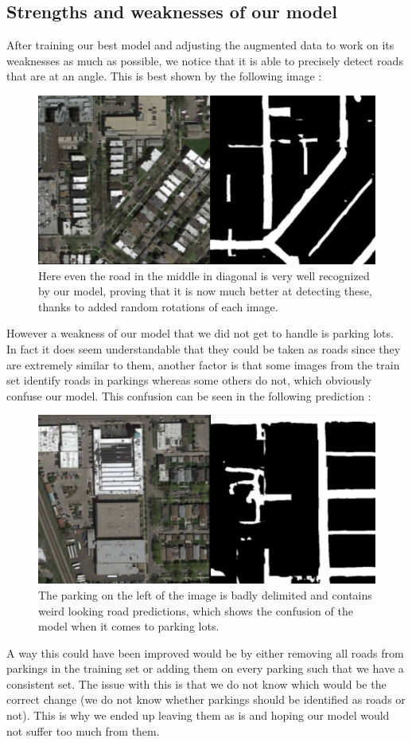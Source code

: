 \documentclass[10pt,conference,compsocconf]{IEEEtran}
\begin{document}
\subsection{Strengths and weaknesses of our model}
After training our best model and adjusting the augmented data to work on its weaknesses as much as possible, we notice that it is able to precisely detect roads that are at an angle. This is best shown by the following image :
\begin{figure}[H]
    \centering
    \includegraphics[scale = 0.3]{report_images/diagonal.jpg} %
    \caption{Here even the road in the middle in diagonal is very well recognized by our model, proving that it is now much better at detecting these, thanks to added random rotations of each image.}
\end{figure}
However a weakness of our model that we did not get to handle is parking lots. In fact it does seem understandable that they could be taken as roads since they are extremely similar to them, another factor is that some images from the train set identify roads in parkings whereas some others do not, which obviously confuse our model. This confusion can be seen in the following prediction : 
\begin{figure}[H]
    \centering
    \includegraphics[scale = 0.3]{report_images/parking.jpg} %
    \caption{The parking on the left of the image is badly delimited and contains weird looking road predictions, which shows the confusion of the model when it comes to parking lots.}
\end{figure}
A way this could have been improved would be by either removing all roads from parkings in the training set or adding them on every parking such that we have a consistent set. The issue with this is that we do not know which would be the correct change (we do not know whether parkings should be identified as roads or not). This is why we ended up leaving them as is and hoping our model would not suffer too much from them.
\end{document}
